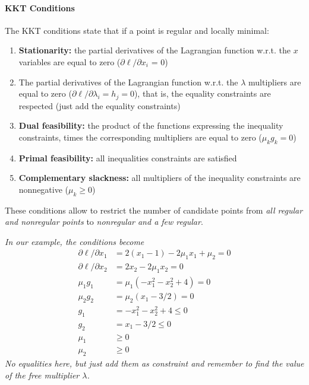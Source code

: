 \paragraph{KKT Conditions} The KKT conditions state that if a point is regular and locally minimal: 
\begin{enumerate}
	\item \textbf{Stationarity:} the partial derivatives of the Lagrangian function w.r.t. the $x$ variables are equal to zero ($\partial \ell / \partial x_i$ = 0)
	
	\item The partial derivatives of the Lagrangian function w.r.t. the $\lambda$ multipliers are equal to zero ($\partial \ell / \partial \lambda_i = h_j = 0$), that is, the equality constraints are respected (just add the equality constraints)
	
	\item \textbf{Dual feasibility:} the product of the functions expressing the inequality constraints, times the corresponding multipliers are equal to zero ($\mu_k g_k = 0$)
	
	\item \textbf{Primal feasibility:} all inequalities constraints are satisfied
	
	\item \textbf{Complementary slackness:} all multipliers of the inequality constraints are nonnegative ($\mu_k \geq 0$)
\end{enumerate}
These conditions allow to restrict the number of candidate points from \textit{all regular and nonregular points} to \textit{nonregular and a few regular}.

\textit{In our example, the conditions become}
\begin{align*}
	\partial \ell / \partial x_1 & = 2(x_1 - 1) - 2 \mu_1 x_1 + \mu_2 = 0 \\
	\partial \ell / \partial x_2 & = 2x_2 - 2 \mu_1 x_2 = 0 \\
	\mu_1 g_1 & = \mu_1(-x_1^2 -x_2^2 + 4) = 0 \\
	\mu_2 g_2 & = \mu_2 (x_1 - 3/2) = 0 \\
	g_1 & = -x_1^2 -x_2^2 + 4 \leq 0 \\
	g_2 & = x_1 - 3/2 \leq 0 \\
	\mu_1 & \geq 0 \\
	\mu_2 & \geq 0
\end{align*}
\textit{No equalities here, but just add them as constraint and remember to find the value of the free multiplier $\lambda$.}

